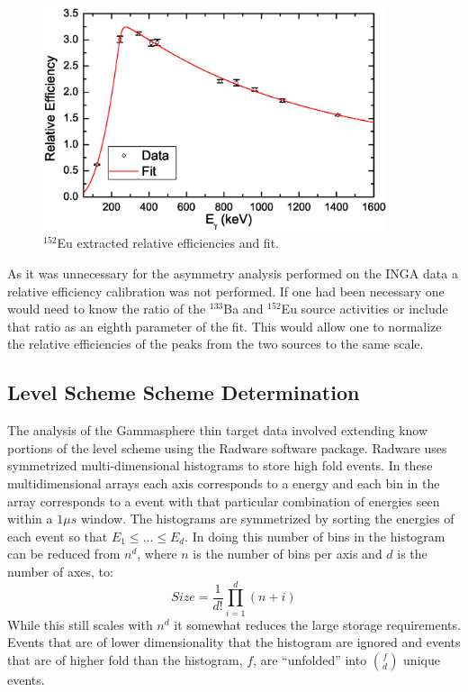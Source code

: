 \begin{figure}[h!]
	\centerline{\includegraphics[width=0.9\textwidth]{./img/c3/gs_eff_plot.eps}}
	\caption{$^{152}$Eu extracted relative efficiencies and fit.}
	\label{fig:chp3-gs-eff-plot}
\end{figure}

As it was unnecessary for the asymmetry analysis performed on the INGA data a relative efficiency calibration was not performed. If one had been necessary one would need to know the ratio of the $^{133}$Ba and $^{152}$Eu source activities or include that ratio as an eighth parameter of the fit. This would allow one to normalize the relative efficiencies of the peaks from the two sources to the same scale.

\subsection{Level Scheme Scheme Determination}
\label{ssec:exp-pr-data-proc-lvl-scheme}
The analysis of the Gammasphere thin target data involved extending know portions of the level scheme using the Radware software package\cite{radware}. Radware uses symmetrized multi-dimensional histograms to store high fold events. In these multidimensional arrays each axis corresponds to a \gr{} energy and each bin in the array corresponds to a event with that particular combination of \gr{} energies seen within a $1\mu{}s$ window. The histograms are symmetrized by sorting the \gr{} energies of each event so that $E_1\leq{}...\leq{}E_d$. In doing this number of bins in the histogram can be reduced from $n^d$, where $n$ is the number of bins per axis and $d$ is the number of axes, to:
\begin{equation}
\label{eqn:chp3-hist-size}
Size=\frac{1}{d!}\prod\limits_{i=1}^{d}(n+i)
\end{equation}
While this still scales with $n^d$ it somewhat reduces the large storage requirements. Events that are of lower dimensionality that the histogram are ignored and events that are of higher fold than the histogram, $f$, are ``unfolded'' into $f \choose d$ unique events.


